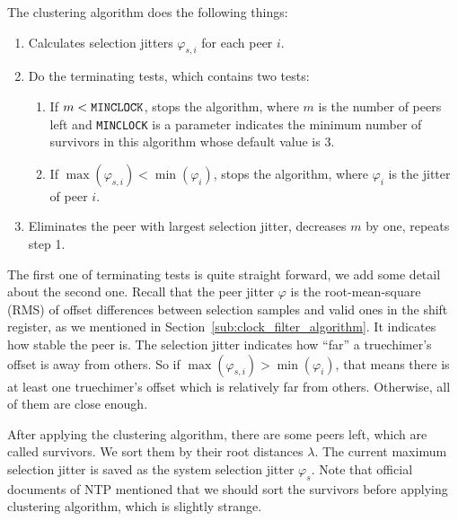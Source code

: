 The clustering algorithm does the following things:
\begin{enumerate}
    \item Calculates selection jitters $\varphi_{s, i}$ for each peer $i$.
    \item Do the terminating tests, which contains two tests:
        \begin{enumerate}
            \item If $m < \verb|MINCLOCK|$, 
                stops the algorithm, where $m$ is
                the number of peers left and \verb|MINCLOCK| is a parameter
                indicates the minimum number of survivors in this algorithm
                whose default value is 3.~\cite{rfc5905}
            \item If $\max(\varphi_{s,i}) < \min(\varphi_i)$, stops the
                algorithm, where $\varphi_i$ is the jitter of peer $i$.
        \end{enumerate}
    \item Eliminates the peer with largest selection jitter, decreases $m$
        by one, repeats step 1.
\end{enumerate}
The first one of terminating tests is quite straight forward, we add some
detail about the second one. Recall that the peer jitter $\varphi$ is the
root-mean-square (RMS) of offset differences between selection samples and
valid ones in the shift register, as we mentioned in
Section~\ref{sub:clock_filter_algorithm}. It indicates how stable the peer is.
The selection jitter indicates how ``far'' a truechimer's offset is away from
others.  So if $\max(\varphi_{s,i}) > \min(\varphi_i)$, that means there is at
least one truechimer's offset which is relatively far from others. Otherwise,
all of them are close enough.

After applying the clustering algorithm, there are some peers left, which are
called survivors. We sort
them by their root distances $\lambda$. The current maximum selection jitter
is saved as the system selection jitter $\varphi_s$. Note that official documents
of NTP mentioned that we should sort the survivors before applying clustering
algorithm, which is slightly strange.

